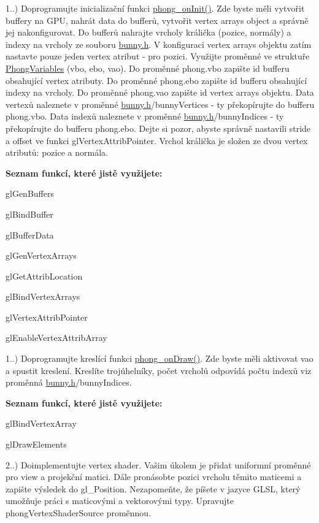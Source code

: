 
\begin{DoxyRefList}
\item[\label{todo__todo000004}%
\hypertarget{todo__todo000004}{}%
Group \hyperlink{group__task1}{task1} ]1..) Doprogramujte inicializační funkci \hyperlink{student_8h_ac2adb2ba4e748239b9db4d037584d3cc}{phong\-\_\-on\-Init()}. Zde byste měli vytvořit buffery na G\-P\-U, nahrát data do bufferů, vytvořit vertex arrays object a správně jej nakonfigurovat. Do bufferů nahrajte vrcholy králička (pozice, normály) a indexy na vrcholy ze souboru \hyperlink{bunny_8h}{bunny.\-h}. V konfiguraci vertex arrays objektu zatím nastavte pouze jeden vertex atribut -\/ pro pozici. Využijte proměnné ve struktuře \hyperlink{structPhongVariables}{Phong\-Variables} (vbo, ebo, vao). Do proměnné phong.\-vbo zapište id bufferu obsahující vertex atributy. Do proměnné phong.\-ebo zapište id bufferu obsahující indexy na vrcholy. Do proměnné phong.\-vao zapište id vertex arrays objektu. Data vertexů naleznete v proměnné \hyperlink{bunny_8h}{bunny.\-h}/bunny\-Vertices -\/ ty překopírujte do bufferu phong.\-vbo. Data indexů naleznete v proměnné \hyperlink{bunny_8h}{bunny.\-h}/bunny\-Indices -\/ ty překopírujte do bufferu phong.\-ebo. Dejte si pozor, abyste správně nastavili stride a offset ve funkci gl\-Vertex\-Attrib\-Pointer. Vrchol králička je složen ze dvou vertex atributů\-: pozice a normála.\par
 {\bfseries Seznam funkcí, které jistě využijete\-:}
\begin{DoxyItemize}
\item gl\-Gen\-Buffers
\item gl\-Bind\-Buffer
\item gl\-Buffer\-Data
\item gl\-Gen\-Vertex\-Arrays
\item gl\-Get\-Attrib\-Location
\item gl\-Bind\-Vertex\-Arrays
\item gl\-Vertex\-Attrib\-Pointer
\item gl\-Enable\-Vertex\-Attrib\-Array 
\end{DoxyItemize}

1..) Doprogramujte kreslící funkci \hyperlink{student_8h_a53ffbb1a271d285abdaf7a029192f47e}{phong\-\_\-on\-Draw()}. Zde byste měli aktivovat vao a spustit kreslení. Kreslíte trojúhelníky, počet vrcholů odpovídá počtu indexů viz proměnná \hyperlink{bunny_8h}{bunny.\-h}/bunny\-Indices.\par
 {\bfseries Seznam funkcí, které jistě využijete\-:}
\begin{DoxyItemize}
\item gl\-Bind\-Vertex\-Array
\item gl\-Draw\-Elements  
\end{DoxyItemize}
\item[\label{todo__todo000001}%
\hypertarget{todo__todo000001}{}%
Group \hyperlink{group__task2}{task2} ]2..) Doimplementujte vertex shader. Vašim úkolem je přidat uniformní proměnné pro view a projekční matici. Dále pronásobte pozici vrcholu těmito maticemi a zapište výsledek do gl\-\_\-\-Position. Nezapomeňte, že píšete v jazyce G\-L\-S\-L, který umožňuje práci s maticovými a vektorovými typy. Upravujte phong\-Vertex\-Shader\-Source proměnnou. 


\end{DoxyRefList}
